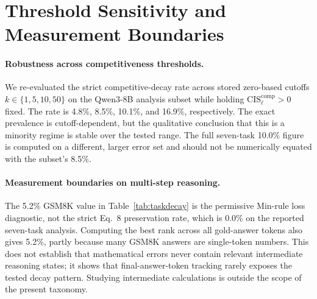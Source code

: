 \documentclass{article} %
\begin{document}
\section{Threshold Sensitivity and Measurement Boundaries}
\label{app:thresholds}

\paragraph{Robustness across competitiveness thresholds.}
We re-evaluated the strict competitive-decay rate across stored zero-based cutoffs $k \in \{1,5,10,50\}$ on the Qwen3-8B analysis subset while holding $\mathrm{CIS}^{\mathrm{comp}}_\ell>0$ fixed. The rate is 4.8\%, 8.5\%, 10.1\%, and 16.9\%, respectively. The exact prevalence is cutoff-dependent, but the qualitative conclusion that this is a minority regime is stable over the tested range. The full seven-task 10.0\% figure is computed on a different, larger error set and should not be numerically equated with the subset's 8.5\%.

\paragraph{Measurement boundaries on multi-step reasoning.}
The 5.2\% GSM8K value in Table~\ref{tab:taskdecay} is the permissive Min-rule loss diagnostic, not the strict Eq.~8 preservation rate, which is 0.0\% on the reported seven-task analysis. Computing the best rank across all gold-answer tokens also gives 5.2\%, partly because many GSM8K answers are single-token numbers. This does not establish that mathematical errors never contain relevant intermediate reasoning states; it shows that final-answer-token tracking rarely exposes the tested decay pattern. Studying intermediate calculations is outside the scope of the present taxonomy.
\end{document}
